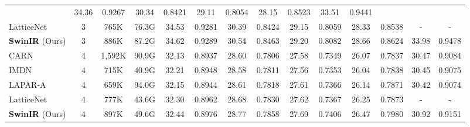\documentclass[10pt,twocolumn,letterpaper]{article}
\newcommand{\R}[1]{\textcolor[rgb]{1.00,0.00,0.00}{#1}}
\newcommand{\B}[1]{\textcolor[rgb]{0.00,0.00,1.00}{#1}}
\newcommand{\algname}{SwinIR}
\newlength \g
\begin{document}
\begin{table*}[!t]
\begin{center}
\begin{tabular}{|l|c|c|c|c|c|c|c|c|c|c|c|c|c|}
& 34.36
& 0.9267
& 30.34
& 0.8421
& 29.11
& 0.8054
& 28.15
& 0.8523
& 33.51
& 0.9441
\\
LatticeNet~\cite{luo2020latticenet} & 3  & 765K & 76.3G 
& \B{34.53}
& \B{0.9281}
& \B{30.39}
& \B{0.8424}
& \B{29.15}
& \B{0.8059}
& \B{28.33}
& \B{0.8538}
& -
& -
\\
\textbf{\algname{}} (Ours)  & 3  & 886K & {87.2G} & \R{34.62}
& \R{0.9289}
& \R{30.54}
& \R{0.8463}
& \R{29.20}
& \R{0.8082}
& \R{28.66}
& \R{0.8624}
& \R{33.98}
& \R{0.9478}
\\
\hline 
\hline
CARN~\cite{ahn2018CARN} & 4  & 1,592K & 90.9G
& 32.13
& 0.8937
& 28.60
& 0.7806
& 27.58
& 0.7349
& 26.07 
& 0.7837
& \B{30.47}
& \B{0.9084}
\\
IMDN~\cite{hui2019imdn} & 4  & 715K & 40.9G
& 32.21
& 0.8948
& 28.58
& 0.7811
& 27.56
& 0.7353 
& 26.04
& 0.7838
& 30.45
& 0.9075
\\
LAPAR-A~\cite{li2021lapar} & 4  & 659K & 94.0G
& 32.15
& 0.8944
& 28.61
& 0.7818
& 27.61
& 0.7366
& 26.14
& 0.7871
& 30.42
& 0.9074
\\
LatticeNet~\cite{luo2020latticenet} & 4  & 777K & 43.6G
& \B{32.30}
& \B{0.8962}
& \B{28.68}
& \B{0.7830}
& \B{27.62}
& \B{0.7367}
& \B{26.25}
& \B{0.7873}
& -
& -
\\
\textbf{\algname{}} (Ours)  & 4  & 897K & {49.6G} & \R{32.44}
& \R{0.8976}
& \R{28.77}
& \R{0.7858}
& \R{27.69}
& \R{0.7406}
& \R{26.47}
& \R{0.7980}
& \R{30.92}
& \R{0.9151}
\\
\hline 
\end{tabular}
\end{center}
\end{table*}




	
	
			
						
						
			
			
						
						
			
\end{document}
